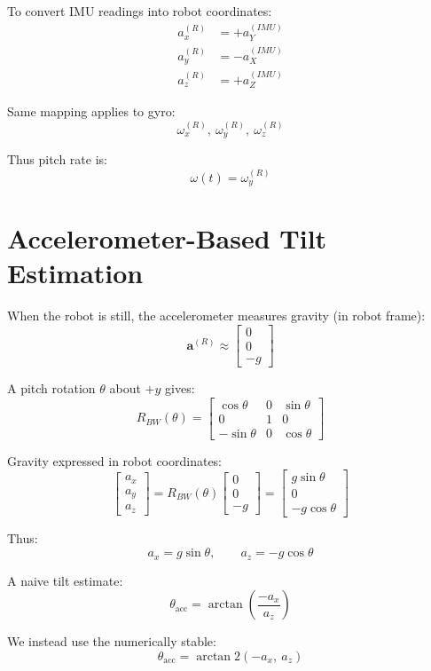 \documentclass[11pt,a4paper]{article}
\begin{document}
To convert IMU readings into robot coordinates:
\[
\begin{aligned}
a_x^{(R)} &= +a_Y^{(IMU)} \\
a_y^{(R)} &= -a_X^{(IMU)} \\
a_z^{(R)} &= +a_Z^{(IMU)}
\end{aligned}
\]

Same mapping applies to gyro:
\[
\omega_x^{(R)},\ \omega_y^{(R)},\ \omega_z^{(R)}
\]

Thus pitch rate is:
\[
\omega(t) = \omega_y^{(R)}
\]

\section{Accelerometer-Based Tilt Estimation}

When the robot is still, the accelerometer measures gravity (in robot frame):
\[
\mathbf{a}^{(R)} \approx \begin{bmatrix}0\\0\\-g\end{bmatrix}
\]

A pitch rotation $\theta$ about $+y$ gives:
\[
R_{BW}(\theta) =
\begin{bmatrix}
\cos\theta & 0 & \sin\theta \\
0 & 1 & 0 \\
-\sin\theta & 0 & \cos\theta
\end{bmatrix}
\]

Gravity expressed in robot coordinates:
\[
\begin{bmatrix}
a_x \\ a_y \\ a_z
\end{bmatrix}
= 
R_{BW}(\theta)
\begin{bmatrix}
0 \\ 0 \\ -g
\end{bmatrix}
=
\begin{bmatrix}
g \sin\theta \\
0 \\
- g \cos\theta
\end{bmatrix}
\]

Thus:
\[
a_x = g\sin\theta, \qquad
a_z = -g\cos\theta
\]

A naive tilt estimate:
\[
\theta_{\text{acc}} = \arctan\!\left(\frac{-a_x}{a_z}\right)
\]

We instead use the numerically stable:
\[
\boxed{
\theta_{\text{acc}} = \arctan2(-a_x,\ a_z)
}
\]
\end{document}
